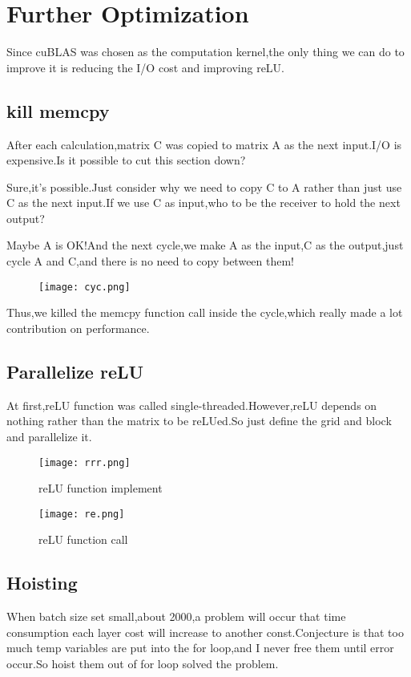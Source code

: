 \documentclass[12pt]{scrartcl} %
\begin{document}
\section{Further Optimization}
Since cuBLAS was chosen as the computation kernel,the only thing we can do to improve it is reducing the I/O cost and improving reLU.
\subsection{kill memcpy}
After each calculation,matrix C was copied to matrix A as the next input.I/O is expensive.Is it possible to cut this section down?

Sure,it's possible.Just consider why we need to copy C to A rather than just use C as the next input.If we use C as input,who to be the receiver to hold the next output?

Maybe A is OK!And the next cycle,we make A as the input,C as the output,just cycle A and C,and there is no need to copy between them!
\begin{figure}[H]
    \centering
    \texttt{[image: cyc.png]}
\end{figure}
Thus,we killed the memcpy function call inside the cycle,which really made a lot contribution on performance.

\subsection{Parallelize reLU}
At first,reLU function was called single-threaded.However,reLU depends on nothing rather than the matrix to be reLUed.So just define the grid and block and parallelize it.
\begin{figure}[H]
    \centering
    \texttt{[image: rrr.png]}
    \caption{reLU function implement}
\end{figure}
\begin{figure}[H]
    \centering
    \texttt{[image: re.png]}
    \caption{reLU function call}
\end{figure}
\subsection{Hoisting}
When batch size set small,about 2000,a problem will occur that time consumption each layer cost will increase to another const.Conjecture is that too much temp variables are put into the for loop,and I never free them until error occur.So hoist them out of for loop solved the problem.
\end{document}
